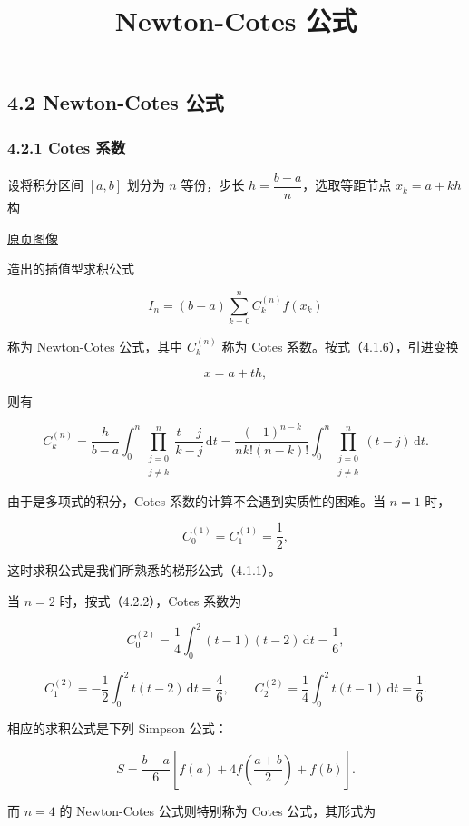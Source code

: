 \documentclass[
  10pt,
  fontset=fandol]{ctexart}
\title{Newton-Cotes 公式}
\author{}
\date{}
\begin{document}
\maketitle

\subsection{4.2 Newton-Cotes 公式}\label{newton-cotes-ux516cux5f0f}

\subsubsection{4.2.1 Cotes 系数}\label{cotes-ux7cfbux6570}

设将积分区间 \([a,b]\) 划分为 \(n\) 等份，步长 \(h=\dfrac{b-a}{n}\)，选取等距节点 \(x_k=a+kh\) 构

\href{../../source-images/pdf-096.jpeg}{原页图像}

造出的插值型求积公式

\[
I_n=(b-a)\sum_{k=0}^n C_k^{(n)}f(x_k)
\tag{4.2.1}
\]

称为 Newton-Cotes 公式，其中 \(C_k^{(n)}\) 称为 Cotes 系数。按式（4.1.6），引进变换

\[
x=a+th,
\]

则有

\[
C_k^{(n)}=\frac{h}{b-a}\int_0^n\prod_{\substack{j=0\\j\ne k}}^n\frac{t-j}{k-j}\,\mathrm{d}t
=\frac{(-1)^{n-k}}{nk!(n-k)!}\int_0^n\prod_{\substack{j=0\\j\ne k}}^n(t-j)\,\mathrm{d}t.
\tag{4.2.2}
\]

由于是多项式的积分，Cotes 系数的计算不会遇到实质性的困难。当 \(n=1\) 时，

\[
C_0^{(1)}=C_1^{(1)}=\frac12,
\]

这时求积公式是我们所熟悉的梯形公式（4.1.1）。

当 \(n=2\) 时，按式（4.2.2），Cotes 系数为

\[
C_0^{(2)}=\frac14\int_0^2(t-1)(t-2)\,\mathrm{d}t=\frac16,
\]

\[
C_1^{(2)}=-\frac12\int_0^2t(t-2)\,\mathrm{d}t=\frac46,\qquad
C_2^{(2)}=\frac14\int_0^2t(t-1)\,\mathrm{d}t=\frac16.
\]

相应的求积公式是下列 Simpson 公式：

\[
S=\frac{b-a}{6}\left[f(a)+4f\left(\frac{a+b}{2}\right)+f(b)\right].
\tag{4.2.3}
\]

而 \(n=4\) 的 Newton-Cotes 公式则特别称为 Cotes 公式，其形式为
\end{document}
